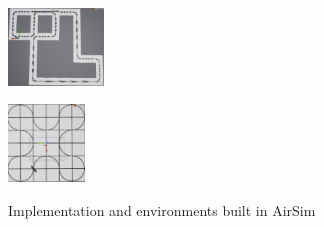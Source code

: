 \documentclass[12pt]{cmuthesis}
\theoremstyle{definition}
\theoremstyle{remark}
\begin{document}
\begin{figure}[tb]
\begin{minipage}[b]{0.15\textwidth}
\label{fig:rect}\end{minipage}
\begin{minipage}[b]{0.15\textwidth}\centering
\includegraphics[width=1in]{graphics/screen2.png}
\label{fig:turns}\end{minipage}
\begin{minipage}[b]{0.15\textwidth}\centering
\includegraphics[width=0.8in]{graphics/screen3.png}
\label{fig:clover}\end{minipage}
\caption{Implementation and environments built in AirSim}
\label{fig:patrol-plan}
\end{figure}
\end{document}

